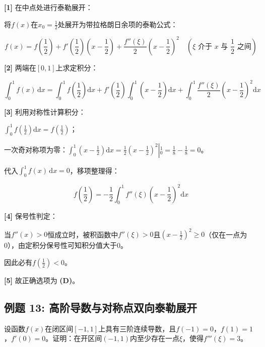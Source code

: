 \documentclass[11pt,a4paper,UTF8]{ctexart}
\begin{document}
\begin{solbox}[分步推导与答题规范]
\textbf{[1]} 在中点处进行泰勒展开：

将$f(x)$在$x_0 = \frac{1}{2}$处展开为带拉格朗日余项的泰勒公式：


\begin{equation*}
f(x) = f\left(\frac{1}{2}\right) + f'\left(\frac{1}{2}\right)\left(x - \frac{1}{2}\right) + \frac{f''(\xi)}{2}\left(x - \frac{1}{2}\right)^2 \quad (\xi \text{ 介于 } x \text{ 与 } \frac{1}{2} \text{ 之间})
\end{equation*}


\textbf{[2]} 两端在$[0, 1]$上求定积分：


\begin{equation*}
\int_0^1 f(x)\,\mathrm{d}x = \int_0^1 f\left(\frac{1}{2}\right)\mathrm{d}x + f'\left(\frac{1}{2}\right)\int_0^1 \left(x - \frac{1}{2}\right)\mathrm{d}x + \int_0^1 \frac{f''(\xi)}{2}\left(x - \frac{1}{2}\right)^2 \mathrm{d}x
\end{equation*}


\textbf{[3]} 利用对称性计算积分：

$\int_0^1 f\left(\frac{1}{2}\right)\mathrm{d}x = f\left(\frac{1}{2}\right)$；

一次奇对称项为零：$\int_0^1 \left(x - \frac{1}{2}\right)\mathrm{d}x = \left.\frac{1}{2}\left(x - \frac{1}{2}\right)^2\right\vert{}_0^1 = \frac{1}{8} - \frac{1}{8} = 0$。

代入$\int_0^1 f(x)\,\mathrm{d}x = 0$，移项整理得：


\begin{equation*}
f\left(\frac{1}{2}\right) = -\frac{1}{2}\int_0^1 f''(\xi)\left(x - \frac{1}{2}\right)^2 \mathrm{d}x
\end{equation*}


\textbf{[4]} 保号性判定：

当$f''(x) > 0$恒成立时，被积函数中$f''(\xi) > 0$且$\left(x - \frac{1}{2}\right)^2 \ge 0$（仅在一点为0），由定积分保号性可知积分值大于0。

因此必有$f\left(\frac{1}{2}\right) < 0$。

\textbf{[5]} 故正确选项为 \textbf{(D)}。
\end{solbox}


\subsection{例题 13: 高阶导数与对称点双向泰勒展开}

设函数$f(x)$在闭区间$[-1, 1]$上具有三阶连续导数，且$f(-1) = 0$，$f(1) = 1$，$f'(0) = 0$。证明：在开区间$(-1, 1)$内至少存在一点$\xi$，使得$f'''(\xi) = 3$。
\end{document}
